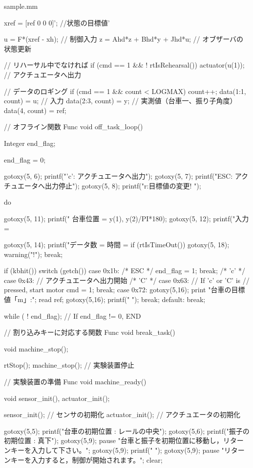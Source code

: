 \begin{breakitembox}[l]{sample.mm}
\begin{verbatimtab}[4]
{	xref = [ref 0 0 0]'; //状態の目標値'
		
	u = F*(xref - xh); // 制御入力
	z = Ahd*z + Bhd*y + Jhd*u; // オブザーバの状態更新

	// リハーサル中でなければ
	if (cmd == 1 && ! rtIsRehearsal()) {
		actuator(u(1));	 		// アクチュエータへ出力
	}

	// データのロギング
	if (cmd == 1 && count < LOGMAX) {
		count++;
		data(1:1, count) = u; // 入力
		data(2:3, count) = y; // 実測値（台車一、振り子角度）
		data(4, count)  = ref;
	}
}

// オフライン関数
Func void off_task_loop()
{
	Integer end_flag;

	end_flag = 0;

	gotoxy(5, 6);
	printf("'c': アクチュエータへ出力");
	gotoxy(5, 7);
	printf("ESC: アクチュエータへ出力停止");
	gotoxy(5, 8);
	printf("r:目標値の変更! ");

	do {
		gotoxy(5, 11);
		printf("  台車位置 = %
			y(1), y(2)/PI*180);
		gotoxy(5, 12);
		printf("入力 = %

		gotoxy(5, 14);
		printf("データ数 = %
				時間 = %
		if (rtIsTimeOut()) {
			gotoxy(5, 18);
			warning(" !\n");
			break;
		}

		if (kbhit()) {
			switch (getch()) {
			  case 0x1b:            /* ESC */
				end_flag = 1;
				break;
		/* 'c' */  case 0x43: // アクチュエータへ出力開始
		/* 'C' */  case 0x63: // If 'c' or 'C' is 
				      // pressed, start motor
				cmd = 1;
				break;
			   case 0x72:
			   	gotoxy(5,16);
				print "台車の目標値「m」:"; read ref;
				gotoxy(5,16);
				printf("  				");
				break;
			  default:
				break;
			}
		}
    } while ( ! end_flag);  // If end_flag != 0, END
}

// 割り込みキーに対応する関数
Func void break_task()
{
	void machine_stop();

	rtStop();
	machine_stop(); // 実験装置停止
}

// 実験装置の準備
Func void machine_ready()
{
	void sensor_init(), actuator_init();

	sensor_init();                  // センサの初期化
	actuator_init();                // アクチュエータの初期化

	gotoxy(5,5);
	printf("台車の初期位置 : レールの中央");
	gotoxy(5,6);
	printf("振子の初期位置 : 真下");
	gotoxy(5,9);
	pause "台車と振子を初期位置に移動し，リターンキーを入力して下さい。";
	gotoxy(5,9);
	printf("                                         ");
	gotoxy(5,9);
	pause "リターンキーを入力すると，制御が開始されます。";
	clear;
}


\end{verbatimtab}
\end{breakitembox}
